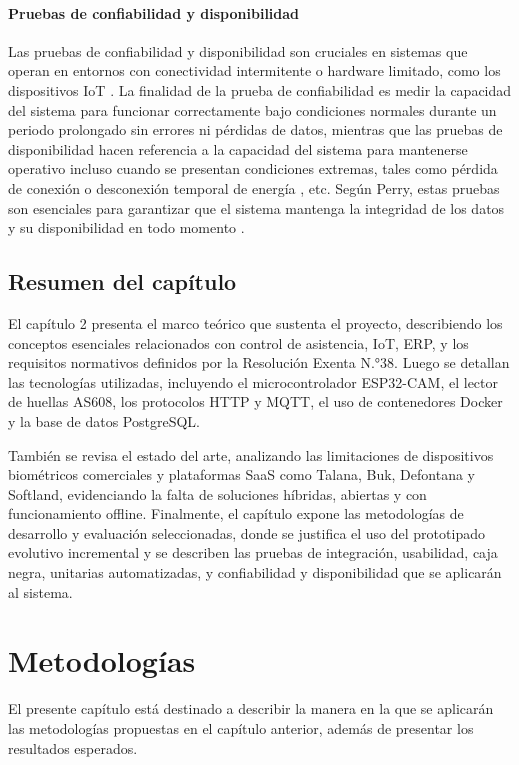 \documentclass{iccmemoria}
\begin{document}
\subsubsection{Pruebas de confiabilidad y disponibilidad}
Las pruebas de confiabilidad y disponibilidad son cruciales en sistemas que operan en entornos con conectividad intermitente o hardware limitado, como los dispositivos IoT \cite{microsoft_iot}. La finalidad de la prueba de confiabilidad es medir la capacidad del sistema para funcionar correctamente bajo condiciones normales durante un periodo prolongado sin errores ni pérdidas de datos, mientras que las pruebas de disponibilidad hacen referencia a la capacidad del sistema para mantenerse operativo incluso cuando se presentan condiciones extremas, tales como pérdida de conexión o desconexión temporal de energía \cite{atlassian_reliability}, etc. Según Perry, estas pruebas son esenciales para garantizar que el sistema mantenga la integridad de los datos y su disponibilidad en todo momento \cite{perry2006}. 

\section{Resumen del capítulo}
El capítulo 2 presenta el marco teórico que sustenta el proyecto, describiendo los conceptos esenciales relacionados con control de asistencia, IoT, ERP, y los requisitos normativos definidos por la Resolución Exenta N.°38. Luego se detallan las tecnologías utilizadas, incluyendo el microcontrolador ESP32-CAM, el lector de huellas AS608, los protocolos HTTP y MQTT, el uso de contenedores Docker y la base de datos PostgreSQL.

También se revisa el estado del arte, analizando las limitaciones de dispositivos biométricos comerciales y plataformas SaaS como Talana, Buk, Defontana y Softland, evidenciando la falta de soluciones híbridas, abiertas y con funcionamiento offline. Finalmente, el capítulo expone las metodologías de desarrollo y evaluación seleccionadas, donde se justifica el uso del prototipado evolutivo incremental y se describen las pruebas de integración, usabilidad, caja negra, unitarias automatizadas, y confiabilidad y disponibilidad que se aplicarán al sistema.

\chapter{Metodologías}
El presente capítulo está destinado a describir la manera en la que se aplicarán las metodologías propuestas en el capítulo anterior, además de presentar los resultados esperados.
\end{document}
